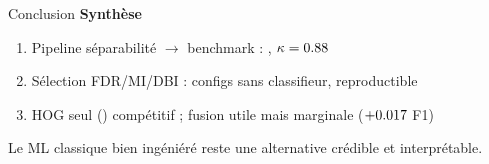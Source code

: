 \begin{frame}{Conclusion}
  \textbf{Synthèse}
  \begin{enumerate}
    \item Pipeline séparabilité $\rightarrow$ benchmark : , $\kappa = 0.88$
    \item Sélection FDR/MI/DBI : \NPhaseOneConfigs{} configs sans classifieur, reproductible
    \item HOG seul (\HogSvmFOne) compétitif ; fusion utile mais marginale ($+0.017$ F1)
  \end{enumerate}
  \vspace{0.6em}
  \centering
  \textcolor{accent}{\large Le ML classique bien ingéniéré reste une alternative crédible et interprétable.}
\end{frame}

